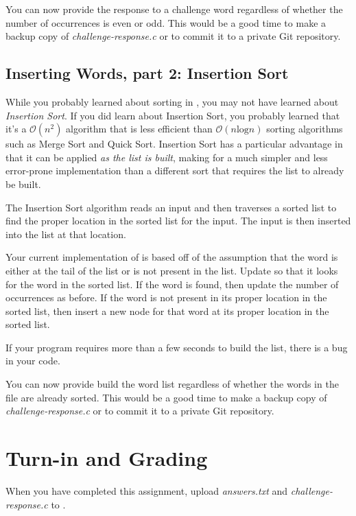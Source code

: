 You can now provide the response to a challenge word regardless of whether the
number of occurrences is even or odd. This would be a good time to make a
backup copy of \textit{challenge-response.c} or to commit it to a private Git
repository.

\subsection{Inserting Words, part 2: Insertion Sort}\label{sec:InsertionSort}

While you probably learned about sorting in \cstwo, you may not have learned
about \textit{Insertion Sort}. If you did learn about Insertion Sort, you
probably learned that it's a $\mathcal{O}(n^2)$ algorithm that is less
efficient than $\mathcal{O}(n\mathrm{log}n)$ sorting algorithms such as
Merge Sort and Quick Sort. Insertion Sort has a particular advantage in that it
can be applied \textit{as the list is built}, making for a much simpler and
less error-prone implementation than a different sort that requires the list to
already be built.

The Insertion Sort algorithm reads an input and then traverses a sorted list to
find the proper location in the sorted list for the input. The input is then
inserted into the list at that location.

Your current implementation of  is based off of the
assumption that the word is either at the tail of the list or is not present in
the list. Update  so that it looks for the word in the
sorted list. If the word is found, then update the number of occurrences as
before. If the word is not present in its proper location in the sorted list,
then insert a new node for that word at its proper location in the sorted list.

If your program requires more than a few seconds to build the list, there is a
bug in your code.

You can now provide build the word list regardless of whether the words in the
file are already sorted. This would be a good time to make a backup copy of
\textit{challenge-response.c} or to commit it to a private Git repository.

\section*{Turn-in and Grading}

When you have completed this assignment, upload \textit{answers.txt} and
\textit{challenge-response.c} to \filesubmission.

